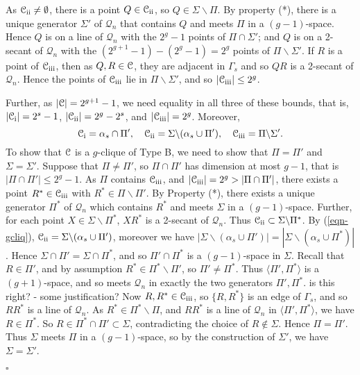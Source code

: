 \documentclass[12pt]{article}
\newenvironment{proof}{\noindent{\bf Proof}\hspace{0.5em}}
    { \null  \hfill $\square$ \par}
\newcommand\C{{\cal C}}
\newcommand{\Q}{\mathscr Q}
\renewcommand\setminus{\backslash}
\newcommand\blue[1]{{\color{blue} #1}}
\newcommand{\setX}{{\mathcal C}_{{\rm\romannumeral 1}}}
\newcommand{\setY}{{\mathcal C}_{{\rm\romannumeral 2}}}
\newcommand{\setZ}{{\mathcal C}_{{\rm\romannumeral 3}}}
\begin{document}
\begin{proof}
{As $\setY\neq\emptyset$, there is a point   $Q\in\setY$,  so $Q\in\Sigma\setminus\Pi$. 
 By property (*),  there is a unique generator $\Sigma'$ of $\Q_n$ that contains $Q$ and meets $\Pi$ in a $(g-1)$-space. Hence $Q$ is on a line of $\Q_n$ with the $2^g-1$ points of $\Pi\cap\Sigma'$; and  $Q$ is on a 2-secant of $\Q_n$ with the $(2^{g+1}-1)-(2^g-1)=2^g$ points of $\Pi\setminus\Sigma'$. 
If $R$ is a point of $\setZ$, then as $Q,R\in\C$, they are adjacent in $\Gamma_s$ and so $QR$ is a 2-secant of $\Q_n$. Hence the points of $\setZ$ lie in $\Pi\setminus\Sigma'$, and so
 $|\setZ|\leq2^g$. 
 
  
Further, as $|\C|=2^{g+1}-1$, we need equality in all three of these  bounds, that is,
$|\setX|=2^s-1$,   
$|\setY|=2^g-2^s$,
and $|\setZ|=2^g$.
Moreover,  \begin{equation}\label{eqn-gcliq} \setX=\alpha_s\cap\Pi',\quad
\setY=\Sigma\setminus(\alpha_s\cup\Pi'), \quad
\setZ=\Pi\setminus\Sigma'.\end{equation}
To show that $\C$ is a $g$-clique of Type B, we need to show that $\Pi=\Pi'$ and $\Sigma=\Sigma'$. 
Suppose that $\Pi\ne\Pi'$, so $\Pi\cap\Pi'$ has dimension at most $g-1$, that is $|\Pi\cap\Pi'|\leq 2^g-1$. As $\Pi$ contains $\setZ$,  and $|\setZ|=2^g>|\Pi\cap\Pi'|$, 
there exists a point $R^*\in\setZ$ with $R^*\in\Pi\backslash\Pi'$.  By Property (*), there exists a unique generator $\Pi^*$ of $\Q_n$ which contains $R^*$ and meets $\Sigma$ in a $(g-1)$-space. 
Further, for each point $X\in\Sigma\setminus\Pi^*$, $XR^*$ is a 2-secant of $\Q_n$. Thus $\setY\subset\Sigma\setminus\Pi^*$. By (\ref{eqn-gcliq}), $\setY=\Sigma\setminus(\alpha_s\cup\Pi')$, moreover we have $|\Sigma\setminus(\alpha_s\cup\Pi')|=|\Sigma\setminus(\alpha_s\cup\Pi^*)|$. Hence $\Sigma\cap\Pi'=\Sigma\cap\Pi^*$, and so $\Pi'\cap\Pi^*$ is a $(g-1)$-space  in $\Sigma$. Recall that $R\in\Pi'$, and by assumption $R^*\in\Pi^*\setminus\Pi'$, so $\Pi'\neq\Pi^*$. Thus $\langle\Pi',\Pi^*\rangle$ is a $(g+1)$-space, and so meets $\Q_n$ in exactly the two generators $\Pi',\Pi^*$.\blue{is this right? - some justification?} Now $R,R^*\in\setZ$, so $\{R,R^*\}$ is an edge of $\Gamma_s$, and so $RR^*$ is a line of $\Q_n$. As $R^*\in\Pi^*\setminus\Pi$, and $RR^*$ is a line of $\Q_n$ in $\langle\Pi',\Pi^*\rangle$, we have $R\in\Pi^*$. So $R\in\Pi^*\cap\Pi'\subset\Sigma$, contradicting the choice of $R\not\in\Sigma$.
 Hence 
 $\Pi=\Pi'$. Thus $\Sigma$ meets $\Pi$ in a $(g-1)$-space, so by the construction of $\Sigma'$, we have $\Sigma=\Sigma'$.
}
%

\end{proof}
\end{document}
